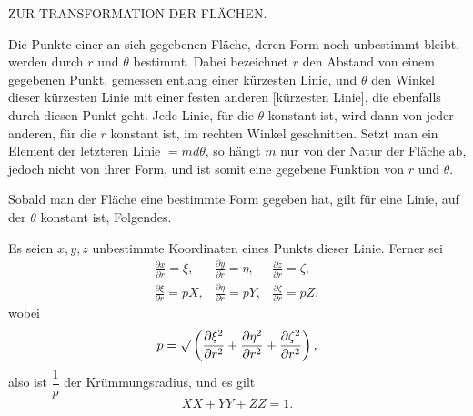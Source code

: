 \clearpage
{}
\begin{center}\large ZUR TRANSFORMATION DER FLÄCHEN.\end{center}
\noindent\hspace*{1.2em}Die Punkte einer an sich gegebenen Fläche, deren Form noch unbestimmt bleibt, werden durch $r$ und $\theta$ bestimmt. Dabei bezeichnet $r$ den Abstand von einem gegebenen Punkt, gemessen entlang einer kürzesten Linie, und $\theta$ den Winkel dieser kürzesten Linie mit einer festen anderen [kürzesten Linie], die ebenfalls durch diesen Punkt geht. Jede Linie, für die $\theta$ konstant ist, wird dann von jeder anderen, für die $r$ konstant ist, im rechten Winkel geschnitten. Setzt man ein Element der letzteren Linie $=md\theta$, so hängt $m$ nur von der Natur der Fläche ab, jedoch nicht von ihrer Form, und ist somit eine gegebene Funktion von $r$ und $\theta$.

Sobald man der Fläche eine bestimmte Form gegeben hat, gilt für eine Linie, auf der $\theta$ konstant ist, Folgendes.

Es seien $x,y,z$ unbestimmte Koordinaten eines Punkts dieser Linie. Ferner sei
\[
\begin{array}{lll}
\displaystyle\frac{\partial x}{\partial r}=\xi,&\displaystyle\frac{\partial y}{\partial r}=\eta,&\displaystyle\frac{\partial z}{\partial r}=\zeta,\\[6pt]
\displaystyle\frac{\partial\xi}{\partial r}=pX,&\displaystyle\frac{\partial\eta}{\partial r}=pY,&\displaystyle\frac{\partial\zeta}{\partial r}=pZ,
\end{array}
\]
\noindent wobei
\[
p=\mathord{\surd}\left(\frac{\partial\xi^2}{\partial r^2}+\frac{\partial\eta^2}{\partial r^2}+\frac{\partial\zeta^2}{\partial r^2}\right),
\]
\noindent also ist $\dfrac1p$ der Krümmungsradius, und es gilt
\[
XX+YY+ZZ=1.
\]
